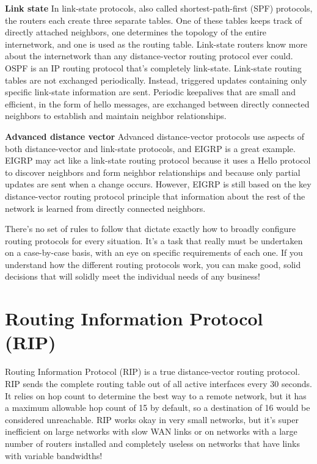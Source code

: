 \textbf{Link state} In link-state protocols, also called
shortest-path-first (SPF) protocols, the routers each create three
separate tables. One of these tables keeps track of directly attached
neighbors, one determines the topology of the entire internetwork, and
one is used as the routing table. Link-state routers know more about the
internetwork than any distance-vector routing protocol ever could. OSPF
is an IP routing protocol that's completely link-state. Link-state
routing tables are not exchanged periodically. Instead, triggered
updates containing only specific link-state information are sent.
Periodic keepalives that are small and efficient, in the form of hello
messages, are exchanged between directly connected neighbors to
establish and maintain neighbor relationships.

\textbf{Advanced distance vector} Advanced distance-vector protocols use
aspects of both distance-vector and link-state protocols, and EIGRP is a
great example. EIGRP may act like a link-state routing protocol because
it uses a Hello protocol to discover neighbors and form neighbor
relationships and because only partial updates are sent when a change
occurs. However, EIGRP is still based on the key distance-vector routing
protocol principle that information about the rest of the network is
learned from directly connected neighbors.

There's no set of rules to follow that dictate exactly how to broadly
configure routing protocols for every situation. It's a task that really
must be undertaken on a case-by-case basis, with an eye on specific
requirements of each one. If you understand how the different routing
protocols work, you can make good, solid decisions that will solidly
meet the individual needs of any business!



\section{Routing Information Protocol (RIP)}

Routing Information Protocol (RIP) is a true distance-vector routing
protocol. RIP sends the complete routing table out of all active
interfaces every 30 seconds. It relies on hop count to determine the
best way to a remote network, but it has a maximum allowable hop count
of 15 by default, so a destination of 16 would be considered
unreachable. RIP works okay in very small networks, but it's super
inefficient on large networks with slow WAN
\protect\hypertarget{c09.xhtmlux5cux23Page_393}{}{}links or on networks
with a large number of routers installed and completely useless on
networks that have links with variable bandwidths!

